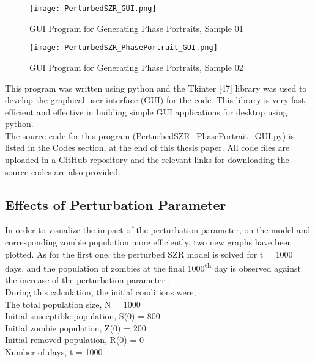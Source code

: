 \begin{figure}[H]
\centering
\texttt{[image: PerturbedSZR\_GUI.png]}
\caption{GUI Program for Generating Phase Portraits, Sample 01}
\label{fig:Perturbed SZR Bifurcation GUI 01}
\end{figure}

\begin{figure}[H]
\centering
\texttt{[image: PerturbedSZR\_PhasePortrait\_GUI.png]}
\caption{GUI Program for Generating Phase Portraits, Sample 02}
\label{fig:Perturbed SZR Bifurcation GUI 02}
\end{figure}

This program was written using python and the Tkinter [47] library was used to develop the graphical user interface (GUI) for the code. This library is very fast, efficient and effective in building simple GUI applications for desktop using python. \\

The source code for this program (PerturbedSZR\_PhasePortrait\_GUI.py) is listed in the Codes section, at the end of this thesis paper. All code files are uploaded in a GitHub repository and the relevant links for downloading the source codes are also provided.  \\

\pagebreak
\subsection{Effects of Perturbation Parameter}

In order to visualize the impact of the perturbation parameter, on the model and corresponding zombie population more efficiently, two new graphs have been plotted. As for the first one, the perturbed SZR model is solved for t = 1000 days, and the population of zombies at the final 1000\textsuperscript{th} day is observed against the increase of the perturbation parameter \textmu. \\

During this calculation, the initial conditions were,\\

\noindent The total population size, N = 1000 \\
Initial susceptible population, S(0) = 800 \\
Initial zombie population, Z(0) = 200 \\
Initial removed population, R(0) = 0 \\
Number of days, t = 1000 \\

